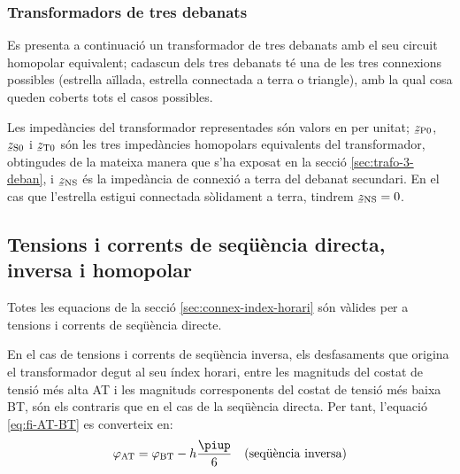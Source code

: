 \begin{center}
    
\end{center}


\subsubsection{Transformadors de tres debanats}\label{sec:cir-hom-3-deb}

Es presenta a continuació un transformador de tres debanats amb el seu circuit homopolar equivalent; cadascun dels tres debanats té una de les tres connexions possibles (estrella aïllada, estrella connectada a terra o triangle), amb la qual cosa queden coberts tots el casos possibles.

Les impedàncies del transformador representades són valors en per unitat; $\cmplx{z}\ped{P0}$, $\cmplx{z}\ped{S0}$ i $\cmplx{z}\ped{T0}$ són les tres impedàncies homopolars equivalents del transformador, obtingudes de la mateixa manera que s'ha exposat en la secció \ref{sec:trafo-3-deban}, i $\cmplx{z}\ped{NS}$ és  la impedància de connexió a terra del debanat secundari. En el cas que l'estrella estigui connectada sòlidament a terra, tindrem $\cmplx{z}\ped{NS}=0$.

\begin{center}
    
\end{center}


\subsection{Tensions i corrents de seqüència directa, inversa i homopolar}

Totes les equacions de la secció \vref{sec:connex-index-horari} són vàlides per a tensions i corrents de seqüència directe.

En el cas de tensions i corrents de seqüència inversa, els desfasaments que origina el transformador degut al seu índex horari, entre les magnituds  del costat de tensió més alta AT i les magnituds corresponents del costat de tensió més baixa BT, són els contraris que en el cas de la seqüència directa. Per tant, l'equació  \eqref{eq:fi-AT-BT} es converteix en:
\begin{equation}
    \varphi\ped{AT} = \varphi\ped{BT} - h\frac{\piup}{6} \quad\text{(seqüència inversa)}
\end{equation}

